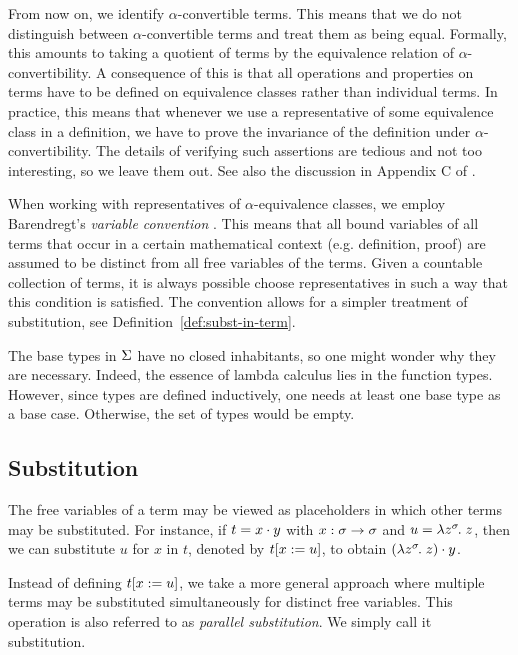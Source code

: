 From now on, we identify $\alpha$-convertible terms. This means that we do not distinguish between $\alpha$-convertible terms and treat them as being equal. Formally, this amounts to taking a quotient of terms by the equivalence relation of $\alpha$-convertibility. A consequence of this is that all operations and properties on terms have to be defined on equivalence classes rather than individual terms. In practice, this means that whenever we use a representative of some equivalence class in a definition, we have to prove the invariance of the definition under $\alpha$-convertibility. The details of verifying such assertions are tedious and not too interesting, so we leave them out. See also the discussion in Appendix C of \cite{barendregt:1984}.

\begin{rem} \label{rem:variable-convention}
When working with representatives of $\alpha$-equivalence classes, we employ Barendregt's \emph{variable convention} \cite{barendregt:1984}. This means that all bound variables of all terms that occur in a certain mathematical context (e.g. definition, proof) are assumed to be distinct from all free variables of the terms. Given a countable collection of terms, it is always possible choose representatives in such a way that this condition is satisfied. The convention allows for a simpler treatment of substitution, see Definition~\ref{def:subst-in-term}.
\end{rem}

\begin{rem}
The base types in $\Sigma$ have no closed inhabitants, so one might wonder why they are necessary. Indeed, the essence of lambda calculus lies in the function types. However, since types are defined inductively, one needs at least one base type as a base case. Otherwise, the set of types would be empty.
\end{rem}

\subsection{Substitution}

The free variables of a term may be viewed as placeholders in which other terms may be substituted. For instance, if $t = x \cdot y$ with $x : \sigma \to \sigma$ and $u = \lambda z^{\sigma}\hspace{-1pt}.\;z$, then we can substitute $u$ for $x$ in $t$, denoted by $t [x := u]$, to obtain $(\lambda z^{\sigma}\hspace{-1pt}.\;z) \cdot y$.

Instead of defining $t [x := u]$, we take a more general approach where multiple terms may be substituted simultaneously for distinct free variables. This operation is also referred to as \textit{parallel substitution}. We simply call it substitution.


